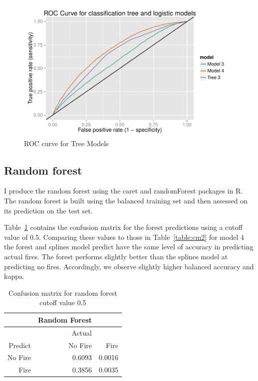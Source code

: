 \documentclass[11pt,a4paper]{article}
\begin{document}
\begin{figure}
  \centering
	\includegraphics[width=1\columnwidth]{figures/trees_roc.pdf}
  \caption{ROC curve for Tree Models}
  \label{fig:troc}
\end{figure}


\subsection{Random forest}

I produce the random forest using the caret and randomForest packages \citep{caret, rf} in R. The random forest is built using the balanced training set and then assessed on its prediction on the test set.

Table~\ref{table:cmrf} contains the confusion matrix for the forest predictions using a cutoff value of 0.5. Comparing these values to those in Table~\ref{table:cm2} for model 4 the forest and splines model predict have the same level of accuracy in predicting actual fires. The forest performs slightly better than the splines model at predicting no fires. Accordingly, we observe slightly higher balanced accuracy and kappa.

\begin{table}
  \centering
  \begin{tabular}{rrr}
    \toprule
            & Random Forest & \\
    \midrule
            & Actual        & \\
    Predict & No Fire       & Fire \\
    \midrule
    No Fire & 0.6093        & 0.0016 \\
    Fire    & 0.3856        & 0.0035 \\
    \bottomrule
  \end{tabular}
  \caption{Confusion matrix for random forest cutoff value 0.5}
  \label{table:cmrf}
\end{table}
\end{document}
